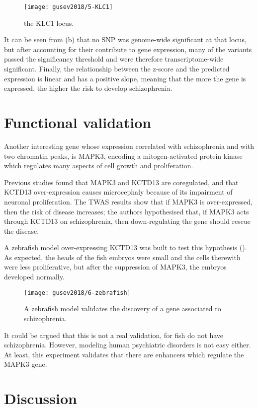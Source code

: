\documentclass[../main.tex]{subfiles}
\begin{document}
\begin{figure}
	\texttt{[image: gusev2018/5-KLC1]}
	\caption{the KLC1 locus.}
\end{figure}

It can be seen from (b) that no SNP was genome-wide significant at that 
locus, but after accounting for their contribute to gene expression, 
many of the variants passed the significancy threshold and were 
therefore transcriptome-wide significant. Finally, the relationship 
between the z-score and the predicted expression is linear and has a 
positive slope, meaning that the more the gene is expressed, the higher 
the risk to develop schizophrenia.

\section{Functional validation}

Another interesting gene whose expression correlated with schizophrenia 
and with two chromatin peaks, is MAPK3, encoding a mitogen-activated 
protein kinase which regulates many aspects of cell growth and 
proliferation. 

Previous studies found that MAPK3 and KCTD13 are coregulated, and that 
KCTD13 over-expression causes microcephaly because of its impairment of 
neuronal proliferation. The TWAS results show that if MAPK3 is 
over-expressed, then the risk of disease increases; the authors 
hypothesised that, if MAPK3 acts through KCTD13 on schizophrenia, then 
down-regulating the gene should rescue the disease.

A zebrafish model over-expressing KCTD13 was built to test this 
hypothesis (). As expected, the heads of the fish 
embryos were small and the cells therewith were less proliferative, but 
after the suppression of MAPK3, the embryos developed normally.

\begin{figure}
	\texttt{[image: gusev2018/6-zebrafish]}
	\caption{A zebrafish model validates the discovery of a gene 
associated to schizophrenia.}
\end{figure}

It could be argued that this is not a real validation, for fish do not 
have schizophrenia. However, modeling human psychiatric disorders is not 
easy either. At least, this experiment validates that there are 
enhancers which regulate the MAPK3 gene.

\section{Discussion}
\end{document}
